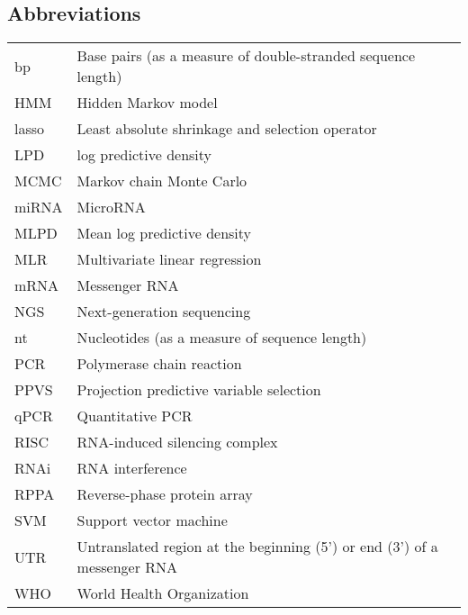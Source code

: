 \documentclass[english,12pt,a4paper,pdftex,elec,utf8]{aaltothesis}
\begin{document}
\subsection*{Abbreviations}

\begin{tabular}{lp{11cm}}
bp          & Base pairs (as a measure of double-stranded sequence length) \\
HMM         & Hidden Markov model \\
lasso       & Least absolute shrinkage and selection operator \\
LPD         & log predictive density \\
MCMC        & Markov chain Monte Carlo \\
miRNA       & MicroRNA \\
MLPD        & Mean log predictive density \\
MLR         & Multivariate linear regression \\
mRNA        & Messenger RNA \\
NGS         & Next-generation sequencing \\
nt          & Nucleotides (as a measure of sequence length) \\
PCR         & Polymerase chain reaction \\
PPVS        & Projection predictive variable selection \\
qPCR        & Quantitative PCR \\
RISC        & RNA-induced silencing complex \\
RNAi        & RNA interference \\
RPPA        & Reverse-phase protein array \\
SVM         & Support vector machine \\
UTR         & Untranslated region at the beginning (5') or end (3') of a messenger RNA \\
WHO         & World Health Organization \\
\end{tabular}


\cleardoublepage
\storeinipagenumber
{}
\setcounter{page}{1}
\end{document}
